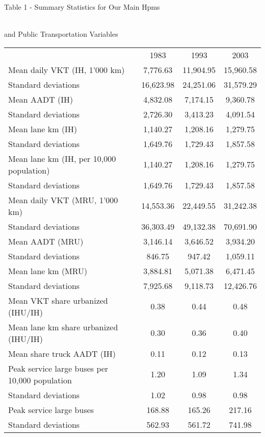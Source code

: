 \begin{center}
\smallskip\begin{large}Table 1 - Summary Statistics for Our Main Hpms\end{large}\\
and Public Transportation Variables\\
\smallskip
\begin{tabular}{lccc}
\hline \noalign{\smallskip} & 1983 & 1993 & 2003\\
\noalign{\smallskip}\hline \noalign{\smallskip}Mean daily VKT (IH, 1'000 km) & 7,776.63 & 11,904.95 & 15,960.58\\
\qquad Standard deviations & 16,623.98 & 24,251.06 & 31,579.29\\
Mean AADT (IH) & 4,832.08 & 7,174.15 & 9,360.78\\
\qquad Standard deviations & 2,726.30 & 3,413.23 & 4,091.54\\
Mean lane km (IH) & 1,140.27 & 1,208.16 & 1,279.75\\
\qquad Standard deviations & 1,649.76 & 1,729.43 & 1,857.58\\
Mean lane km (IH, per 10,000 population) & 1,140.27 & 1,208.16 & 1,279.75\\
\qquad Standard deviations & 1,649.76 & 1,729.43 & 1,857.58\\
Mean daily VKT (MRU, 1'000 km) & 14,553.36 & 22,449.55 & 31,242.38\\
\qquad Standard deviations & 36,303.49 & 49,132.38 & 70,691.90\\
Mean AADT (MRU) & 3,146.14 & 3,646.52 & 3,934.20\\
\qquad Standard deviations & 846.75 & 947.42 & 1,059.11\\
Mean lane km (MRU) & 3,884.81 & 5,071.38 & 6,471.45\\
\qquad Standard deviations & 7,925.68 & 9,118.73 & 12,426.76\\
Mean VKT share urbanized (IHU/IH) & 0.38 & 0.44 & 0.48\\
Mean lane km share urbanized (IHU/IH) & 0.30 & 0.36 & 0.40\\
Mean share truck AADT (IH) & 0.11 & 0.12 & 0.13\\
Peak service large buses per 10,000 population & 1.20 & 1.09 & 1.34\\
\qquad Standard deviations & 1.02 & 0.98 & 0.98\\
Peak service large buses & 168.88 & 165.26 & 217.16\\
\qquad Standard deviations & 562.93 & 561.72 & 741.98\\

\end{tabular}
\end{center}
